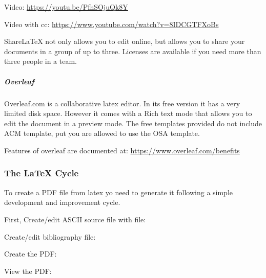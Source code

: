 Video: \url{https://youtu.be/PfhSOjuQk8Y}

Video with cc: \url{https://www.youtube.com/watch?v=8IDCGTFXoBs}

ShareLaTeX not only allows you to edit online, but allows you to share
your documents in a group of up to three. Licenses are available if
you need more than three people in a team.


\subparagraph{Overleaf}
\label{\detokenize{lesson/doc/latex:overleaf}}
Overleaf.com is a collaborative latex editor. In its free version it
has a very limited disk space. However it comes with a Rich text mode
that allows you to edit the document in a preview mode. The free templates
provided do not include ACM template, put you are allowed to use the
OSA template.

Features of overleaf are documented at: \url{https://www.overleaf.com/benefits}


\subsubsection{The LaTeX Cycle}
\label{\detokenize{lesson/doc/latex:the-latex-cycle}}
To create a PDF file from latex yo need to generate it following a
simple development and improvement cycle.

First, Create/edit ASCII source file with  file:

\begin{sphinxVerbatim}[commandchars=\\\{\}]
 
\end{sphinxVerbatim}

Create/edit bibliography file:

\begin{sphinxVerbatim}[commandchars=\\\{\}]
 
\end{sphinxVerbatim}

Create the PDF:

\begin{sphinxVerbatim}[commandchars=\\\{\}]
 
 
 
 
\end{sphinxVerbatim}

View the PDF:

\begin{sphinxVerbatim}[commandchars=\\\{\}]
 
\end{sphinxVerbatim}

